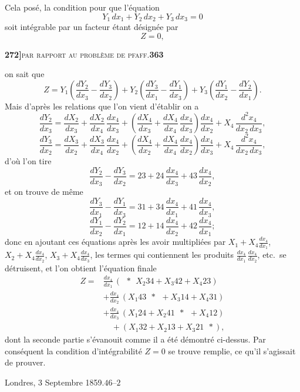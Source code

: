 \documentclass[11pt]{article}
\begin{document}
\medskip

Cela pos\'e, la condition pour que l'\'equation
\[
Y_1\, dx_1 + Y_2\, dx_2 + Y_3\, dx_3 = 0
\]
soit int\'egrable par un facteur \'etant d\'esign\'ee par
\[
Z = 0,
\]

\newpage
\noindent\textbf{272]}\hfill\textsc{par rapport au probl\`eme de pfaff.}\hfill\textbf{363}

\medskip

\noindent on sait que
\[
Z = Y_1\!\left(\frac{dY_2}{dx_3} - \frac{dY_3}{dx_2}\right) + Y_2\!\left(\frac{dY_3}{dx_1} - \frac{dY_1}{dx_3}\right) + Y_3\!\left(\frac{dY_1}{dx_2} - \frac{dY_2}{dx_1}\right).
\]
Mais d'apr\`es les relations que l'on vient d'\'etablir on a
\[
\frac{dY_2}{dx_3} = \frac{dX_2}{dx_3} + \frac{dX_2}{dx_4}\, \frac{dx_4}{dx_3} + \!\left(\frac{dX_4}{dx_3} + \frac{dX_4}{dx_4}\, \frac{dx_4}{dx_3}\right)\!\frac{dx_4}{dx_2} + X_4\, \frac{d^2 x_4}{dx_2\, dx_3},
\]
\[
\frac{dY_3}{dx_2} = \frac{dX_3}{dx_2} + \frac{dX_3}{dx_4}\, \frac{dx_4}{dx_2} + \!\left(\frac{dX_4}{dx_2} + \frac{dX_4}{dx_4}\, \frac{dx_4}{dx_2}\right)\!\frac{dx_4}{dx_3} + X_4\, \frac{d^2 x_4}{dx_2\, dx_3},
\]
d'o\`u l'on tire
\[
\frac{dY_2}{dx_3} - \frac{dY_3}{dx_2} = 23 + 24\, \frac{dx_4}{dx_3} + 43\, \frac{dx_4}{dx_2},
\]
et on trouve de m\^eme
\[
\frac{dY_3}{dx_1} - \frac{dY_1}{dx_3} = 31 + 34\, \frac{dx_4}{dx_1} + 41\, \frac{dx_4}{dx_3},
\]
\[
\frac{dY_1}{dx_2} - \frac{dY_2}{dx_1} = 12 + 14\, \frac{dx_4}{dx_2} + 42\, \frac{dx_4}{dx_1};
\]
donc en ajoutant ces \'equations apr\`es les avoir multipli\'ees par $X_1 + X_4 \frac{dx_4}{dx_1}$, $X_2 + X_4 \frac{dx_4}{dx_2}$, $X_3 + X_4 \frac{dx_4}{dx_3}$, les termes qui contiennent les produits $\frac{dx_4}{dx_1}\, \frac{dx_4}{dx_2}$, etc.\ se d\'etruisent, et l'on obtient l'\'equation finale
\[
\begin{aligned}
Z = {}& \frac{dx_4}{dx_1}\,(\ \ * \ \ X_2 34 + X_3 42 + X_4 23) \\
& + \frac{dx_4}{dx_2}\,(X_1 43 \ \ * \ \ + X_3 14 + X_4 31) \\
& + \frac{dx_4}{dx_3}\,(X_1 24 + X_2 41 \ \ * \ \ + X_4 12) \\
& \quad + (X_1 32 + X_2 13 + X_3 21 \ \ *),
\end{aligned}
\]
dont la seconde partie s'\'evanouit comme il a \'et\'e d\'emontr\'e ci-dessus. Par cons\'equent la condition d'int\'egrabilit\'e $Z = 0$ se trouve remplie, ce qu'il s'agissait de prouver.

\medskip

\hfill Londres, 3 Septembre 1859.\hfill $46$--$2$
\end{document}
